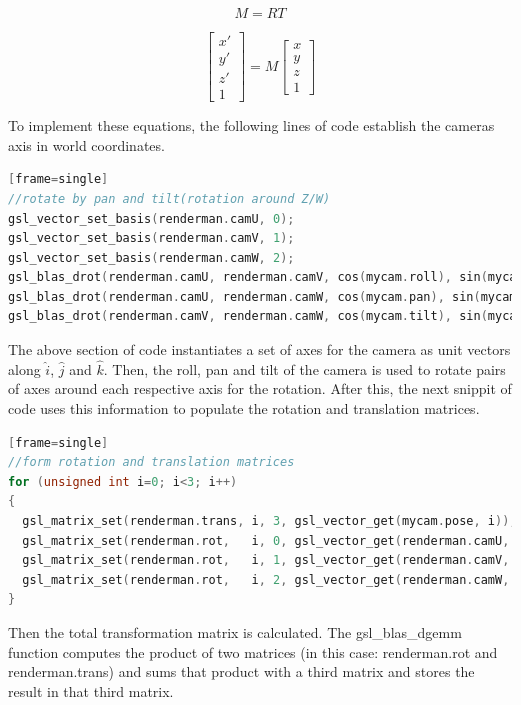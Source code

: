 \documentclass{article}
\begin{document}
\begin{equation}
M = RT
\label{eqn:total}
\end{equation}

\begin{equation}
\begin{bmatrix}
  x' \\
  y' \\
  z' \\
  1
\end{bmatrix}
  = M
\begin{bmatrix}
  x \\
  y \\
  z \\
  1
\end{bmatrix}
\label{eqn:doit}
\end{equation}

To implement these equations, the following lines of code establish the cameras axis in world coordinates.
\begin{lstlisting}[language=c][frame=single]
//rotate by pan and tilt(rotation around Z/W)
gsl_vector_set_basis(renderman.camU, 0);
gsl_vector_set_basis(renderman.camV, 1);
gsl_vector_set_basis(renderman.camW, 2);
gsl_blas_drot(renderman.camU, renderman.camV, cos(mycam.roll), sin(mycam.roll));
gsl_blas_drot(renderman.camU, renderman.camW, cos(mycam.pan), sin(mycam.pan));
gsl_blas_drot(renderman.camV, renderman.camW, cos(mycam.tilt), sin(mycam.tilt));
\end{lstlisting}

The above section of code instantiates a set of axes for the camera as unit vectors along
 $\hat i$, $\hat j$ and $\hat k$. Then, the roll, pan and tilt of the camera is used to rotate pairs of 
axes around each respective axis for the rotation. After this, the next snippit of code uses this information
to populate the rotation and translation matrices.

\begin{lstlisting}[language=c][frame=single]
//form rotation and translation matrices
for (unsigned int i=0; i<3; i++)
{
  gsl_matrix_set(renderman.trans, i, 3, gsl_vector_get(mycam.pose, i));
  gsl_matrix_set(renderman.rot,   i, 0, gsl_vector_get(renderman.camU, i));
  gsl_matrix_set(renderman.rot,   i, 1, gsl_vector_get(renderman.camV, i));
  gsl_matrix_set(renderman.rot,   i, 2, gsl_vector_get(renderman.camW, i));
}
\end{lstlisting}

Then the total transformation matrix is calculated. The gsl\_blas\_dgemm function computes the product of two matrices
(in this case: renderman.rot and renderman.trans) and sums that product with a third matrix and stores the result
in that third matrix.
\end{document}
